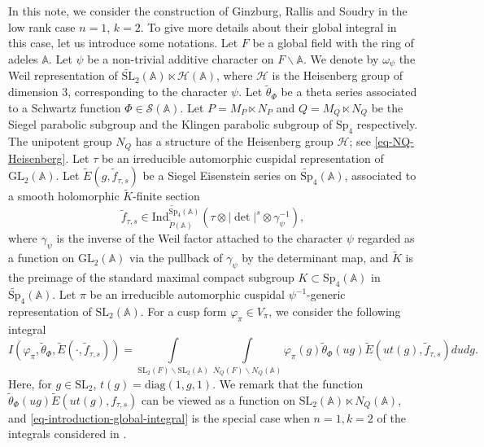 \documentclass[11pt]{amsart}
\theoremstyle{definition}
\theoremstyle{remark}
\newcommand{\A}{\mathbb{A}}
\newcommand{\GL}{\mathrm{GL}}
\begin{document}
In this note, we consider the construction of Ginzburg, Rallis and Soudry \cite{GinzburgRallisSoudry1998} in the low rank case $n=1$, $k=2$.
To give more details about their global integral in this case, let us introduce some notations. Let $F$ be a global field with the ring of adeles $\mathbb{A}$. Let $\psi$ be a non-trivial additive character on $F\backslash \mathbb{A}$. We denote by $\omega_\psi$ the Weil representation of $\widetilde{\mathrm{SL}}_2(\mathbb{A})\ltimes\mathcal{H}(\mathbb{A})$, where $\mathcal{H}$ is the Heisenberg group of dimension 3, corresponding to the character $\psi$. Let $ \widetilde{\theta}_{\Phi}$ be a theta series associated to a Schwartz function $\Phi\in \mathcal{S}(\mathbb{A})$. Let $P=M_P\ltimes N_P$ and $Q=M_Q\ltimes N_Q$ be the Siegel parabolic subgroup and the Klingen parabolic subgroup of $\mathrm{Sp}_4$ respectively. 
The unipotent group $N_Q$ has a structure of the Heisenberg group $\mathcal{H}$; see \eqref{eq-NQ-Heisenberg}.
Let $\tau$ be an irreducible automorphic cuspidal representation of $\mathrm{GL}_2(\mathbb{A})$. 
Let $\widetilde{E}(g, \tilde{f}_{\tau, s})$ be a Siegel Eisenstein series on $\widetilde{\mathrm{Sp}}_4(\mathbb{A})$, associated to a smooth holomorphic $\widetilde{K}$-finite section 
\begin{equation*}
    \tilde{f}_{\tau, s}\in \mathrm{Ind}_{\widetilde{P}(\mathbb{A})}^{\widetilde{\mathrm{Sp}}_4(\mathbb{A})}(\tau \otimes   |\det|^s \otimes \gamma_\psi^{-1} ),
\end{equation*} 
where $\gamma_\psi$ is the inverse of the Weil factor attached to the character $\psi$ regarded as a function on $\GL_2(\A)$ via the pullback of $\gamma_\psi$ by the determinant map, and $\widetilde{K}$ is the preimage of the standard maximal compact subgroup $K\subset \mathrm{Sp}_4(\mathbb{A})$ in $\widetilde{\mathrm{Sp}}_4(\mathbb{A})$. 
Let $\pi$ be an irreducible automorphic cuspidal $\psi^{-1}$-generic representation of $\mathrm{SL}_2(\mathbb{A})$. For a cusp form $\varphi_\pi\in V_\pi$, we consider the following integral
\begin{equation}
I(\varphi_\pi,  \widetilde{\theta}_{\Phi},\widetilde{E}(\cdot, \tilde{f}_{\tau, s}))= \int\limits_{\mathrm{SL}_2(F)\backslash \mathrm{SL}_2(\mathbb{A})} \int\limits_{N_Q(F)\backslash N_Q(\mathbb{A})}  \varphi_\pi(g)  \widetilde{\theta}_{\Phi}(ug) \widetilde{E}(u t(g), \tilde{f}_{\tau, s})du dg.
\label{eq-introduction-global-integral}
\end{equation}
Here, for $g\in \text{SL}_2$, $t(g)=\mathrm{diag}(1, g, 1)$. We remark that the function $\widetilde{\theta}_{\Phi}(ug) \widetilde{E}(ut(g), f_{\tau, s})$ can be viewed as a function on $\mathrm{SL}_2(\mathbb{A})\ltimes N_Q(\mathbb{A})$, and \eqref{eq-introduction-global-integral} is the special case when $n=1, k=2$ of the integrals considered in \cite[Section 5]{GinzburgRallisSoudry1998}.
\end{document}
